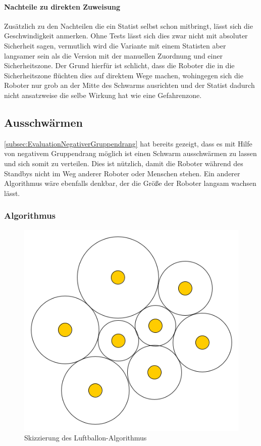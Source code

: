 \paragraph*{Nachteile zu direkten Zuweisung}
Zusätzlich zu den Nachteilen die ein Statist selbst schon mitbringt, lässt sich die Geschwindigkeit anmerken. Ohne Tests lässt sich dies zwar nicht mit absoluter Sicherheit sagen, vermutlich wird die Variante mit einem Statisten aber langsamer sein als die Version mit der manuellen Zuordnung und einer Sicherheitszone. Der Grund hierfür ist schlicht, dass die Roboter die in die Sicherheitszone flüchten dies auf direktem Wege machen, wohingegen sich die Roboter nur grob an der Mitte des Schwarms ausrichten und der Statist dadurch nicht ansatzweise die selbe Wirkung hat wie eine Gefahrenzone.

\subsection{Ausschwärmen}

\autoref{subsec:EvaluationNegativerGruppendrang} hat bereits gezeigt, dass es mit Hilfe von negativem Gruppendrang möglich ist einen Schwarm ausschwärmen zu lassen und sich somit zu verteilen. Dies ist nützlich, damit die Roboter während des Standbys nicht im Weg anderer Roboter oder Menschen stehen.
Ein anderer Algorithmus wäre ebenfalls denkbar, der die Größe der Roboter langsam wachsen lässt.

\subsubsection*{Algorithmus}

\begin{figure}
	\includegraphics[width=\pictureWidth,keepaspectratio]{graphics/LuftballonAlgorithmus.png}
	\caption{Skizzierung des Luftballon-Algorithmus}
	\label{pic:Luftballon}
\end{figure}

